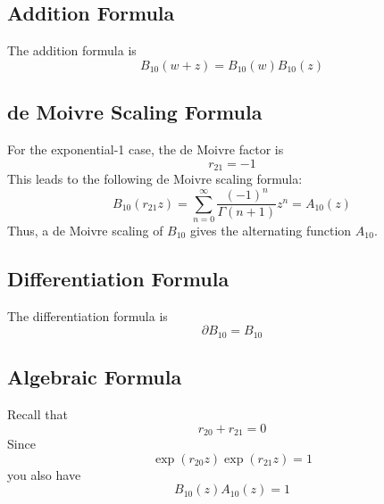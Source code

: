 \subsection{Addition Formula}
The addition formula is
\begin{equation}
    B_{10}(w + z) = B_{10}(w) B_{10}(z)
\end{equation}
\subsection{de Moivre Scaling Formula}
For the exponential-1 case, the de Moivre factor is
\begin{equation}
    r_{21} = -1
\end{equation}
This leads to the following de Moivre scaling formula:
\begin{equation}
    B_{10}(r_{21} z) = \sum_{n = 0}^{\infty} \frac{(-1)^{n}}{\Gamma(n + 1)} z^{n} = A_{10}(z)
\end{equation}
Thus, a de Moivre scaling of $B_{10}$ gives the alternating function $A_{10}$.
\subsection{Differentiation Formula}
The differentiation formula is
\begin{equation}
    \partial B_{10} = B_{10}
\end{equation}
\subsection{Algebraic Formula}
Recall that
\begin{equation}
    r_{20} + r_{21} = 0
\end{equation}
Since
\begin{equation}
    \exp\left(r_{20} z\right) \exp\left(r_{21} z\right) = 1
\end{equation}
you also have
\begin{equation}
    B_{10}(z) A_{10}(z) = 1
\end{equation}
